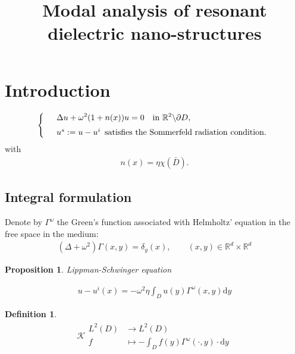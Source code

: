 \documentclass[11pt]{article}
\title{Modal analysis of resonant dielectric nano-structures}
\numberwithin{equation}{section}
\newcommand{\ds}{\displaystyle}
\def\nm{\noalign{\medskip}}
\newtheorem{definition}{Definition}[section]
\newtheorem{proposition}{Proposition}[section]
\newcommand{\R}{\mathbb{R}}
\newcommand{\dd}{\mathrm{d}}
\begin{document}
\maketitle


\section{Introduction}

\begin{equation}
\label{eq:transverse} 
 \left\{
\begin{array} {ll}
&\ds\Delta u+ \omega^2 (1+n(x)) u  = 0 \quad \mbox{in } \R^2 \backslash \partial D, \\
\nm
&  u^s:= u- u^{i}  \,\,\,  \mbox{satisfies the Sommerfeld radiation condition}.
  \end{array}
 \right.
\end{equation}
with
\begin{align}
n(x)= \eta\chi(\bar{D}).
\end{align}


\subsection{Integral formulation}

Denote by $\Gamma^\omega$ the Green's function associated with Helmholtz' equation in the free space in the medium:
\begin{align*}
\left( \Delta +\omega^2\right) \Gamma(x,y)= \delta_y(x),\qquad (x,y)\in \R^d\times \R^d
\end{align*}

\begin{proposition}{Lippman-Schwinger equation}

\begin{align*}
u-u^i(x) = -\omega^2\eta \int_D u(y) \Gamma^\omega(x,y) \dd y
\end{align*}
\end{proposition}

\begin{definition}
\begin{align*}
\mathcal{K} \begin{aligned} L^2(D)& \longrightarrow L^2(D) \\
f &\longmapsto - \int_D f(y) \Gamma^\omega (\cdot,y) \cdot  \dd y
\end{aligned}
\end{align*}
\end{definition}
\end{document}
